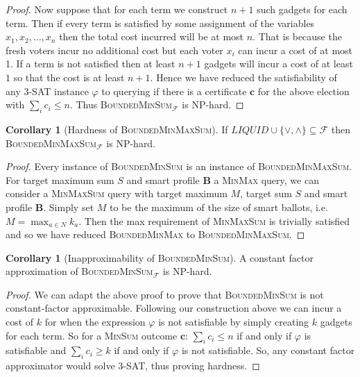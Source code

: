 \documentclass[11pt,a4paper, titlepage]{article}
\theoremstyle{definition}
\newtheorem{corollary}[theorem]{Corollary}
\let\vec\mathbf
\begin{document}
\begin{proof}
    Now suppose that for each term we construct $n + 1$ such gadgets for each term. Then if every term is satisfied by some assignment of the variables $x_1, x_2, \ldots, x_n$ then the total cost incurred will be at most $n$. That is because the fresh voters incur no additional cost but each voter $x_i$ can incur a cost of at most 1.
    If a term is not satisfied then at least $n+1$ gadgets will incur a cost of at least $1$ so that the cost is at least $n+1$. 
    Hence we have reduced the satisfiability of any \textsc{3-SAT} instance $\varphi$ to querying if there is a certificate $\vec{c}$ for the above election with $\sum_{i} c_i \leq n$. Thus \textsc{BoundedMinSum}$_\mathcal{F}$ is NP-hard.
\end{proof}

\begin{corollary}[Hardness of \textsc{BoundedMinMaxSum}]
    If $ \mathit{LIQUID} \cup \{\lor, \land\} \subseteq \mathcal{F}$ then \textsc{BoundedMinMaxSum}$_\mathcal{F}$ is NP-hard. 
\end{corollary}

\begin{proof}
    Every instance of \textsc{BoundedMinSum} is an instance of \textsc{BoundedMinMaxSum}. For target maximum sum $S$ and smart profile $\vec{B}$ a \textsc{MinMax} query, we can consider a \textsc{MinMaxSum} query with target maximum $M$, target sum $S$ and smart profile $\vec{B}$. Simply set $M$ to be the maximum of the size of smart ballots, i.e. $M = \max_{a \in N} k_a$. Then the max requirement of \textsc{MinMaxSum} is trivially satisfied and so we have reduced \textsc{BoundedMinMax} to \textsc{BoundedMinMaxSum}.
\end{proof}


\begin{corollary}[Inapproximability of \textsc{BoundedMinSum}] A constant factor approximation of \textsc{BoundedMinSum}$_\mathcal{F}$ is NP-hard.    
\end{corollary}

\begin{proof}
    We can adapt the above proof to prove that \textsc{BoundedMinSum} is not constant-factor approximable. 
    Following our construction above we can incur a cost of $k$ for when the expression $\varphi$ is not satisfiable by simply creating $k$ gadgets for each term. 
    So for a \textsc{MinSum} outcome $\vec{c}$:   $\sum_i c_i \leq n$ if and only if $\varphi$ is satisfiable and $\sum_i c_i \geq k$ if and only if $\varphi$ is not satisfiable. 
    So, any constant factor approximator would solve \textsc{3-SAT}, thus proving hardness.
\end{proof}
\end{document}
